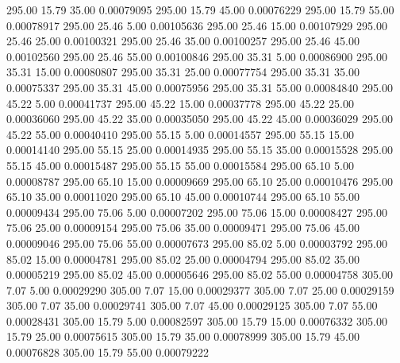     295.00     15.79     35.00     0.00079095
    295.00     15.79     45.00     0.00076229
    295.00     15.79     55.00     0.00078917
    295.00     25.46      5.00     0.00105636
    295.00     25.46     15.00     0.00107929
    295.00     25.46     25.00     0.00100321
    295.00     25.46     35.00     0.00100257
    295.00     25.46     45.00     0.00102560
    295.00     25.46     55.00     0.00100846
    295.00     35.31      5.00     0.00086900
    295.00     35.31     15.00     0.00080807
    295.00     35.31     25.00     0.00077754
    295.00     35.31     35.00     0.00075337
    295.00     35.31     45.00     0.00075956
    295.00     35.31     55.00     0.00084840
    295.00     45.22      5.00     0.00041737
    295.00     45.22     15.00     0.00037778
    295.00     45.22     25.00     0.00036060
    295.00     45.22     35.00     0.00035050
    295.00     45.22     45.00     0.00036029
    295.00     45.22     55.00     0.00040410
    295.00     55.15      5.00     0.00014557
    295.00     55.15     15.00     0.00014140
    295.00     55.15     25.00     0.00014935
    295.00     55.15     35.00     0.00015528
    295.00     55.15     45.00     0.00015487
    295.00     55.15     55.00     0.00015584
    295.00     65.10      5.00     0.00008787
    295.00     65.10     15.00     0.00009669
    295.00     65.10     25.00     0.00010476
    295.00     65.10     35.00     0.00011020
    295.00     65.10     45.00     0.00010744
    295.00     65.10     55.00     0.00009434
    295.00     75.06      5.00     0.00007202
    295.00     75.06     15.00     0.00008427
    295.00     75.06     25.00     0.00009154
    295.00     75.06     35.00     0.00009471
    295.00     75.06     45.00     0.00009046
    295.00     75.06     55.00     0.00007673
    295.00     85.02      5.00     0.00003792
    295.00     85.02     15.00     0.00004781
    295.00     85.02     25.00     0.00004794
    295.00     85.02     35.00     0.00005219
    295.00     85.02     45.00     0.00005646
    295.00     85.02     55.00     0.00004758
    305.00      7.07      5.00     0.00029290
    305.00      7.07     15.00     0.00029377
    305.00      7.07     25.00     0.00029159
    305.00      7.07     35.00     0.00029741
    305.00      7.07     45.00     0.00029125
    305.00      7.07     55.00     0.00028431
    305.00     15.79      5.00     0.00082597
    305.00     15.79     15.00     0.00076332
    305.00     15.79     25.00     0.00075615
    305.00     15.79     35.00     0.00078999
    305.00     15.79     45.00     0.00076828
    305.00     15.79     55.00     0.00079222
